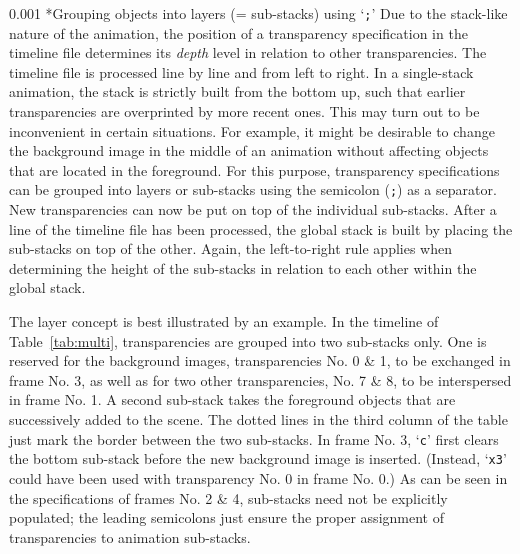 \documentclass[a4paper]{article}
\makeatletter
\newcommand\myparagraph{\@startsection{paragraph}{3}{\z@}%
                                     {\parskip}%
                                     {0.001\parskip}%
                                     {\itshape\normalsize}}
\makeatother
\begin{document}
\myparagraph*{Grouping objects into layers (= sub-stacks) using `{\tt;}'}
Due to the stack-like nature of the animation, the position of a transparency specification in the timeline file determines its \emph{depth} level in relation to other transparencies. The timeline file is processed line by line and from left to right. In a single-stack animation, the stack is strictly built from the bottom up, such that earlier transparencies are overprinted by more recent ones. This may turn out to be inconvenient in certain situations. For example, it might be desirable to change the background image in the middle of an animation without affecting objects that are located in the foreground. For this purpose, transparency specifications can be grouped into layers or sub-stacks using the semicolon (\verb+;+) as a separator. New transparencies can now be put on top of the individual sub-stacks. After a line of the timeline file has been processed, the global stack is built by placing the sub-stacks on top of the other. Again, the left-to-right rule applies when determining the height of the sub-stacks in relation to each other within the global stack.

The layer concept is best illustrated by an example. In the timeline of Table~\ref{tab:multi}, transparencies are grouped into two sub-stacks only. One is reserved for the background images, transparencies No. 0 \& 1, to be exchanged in frame No. 3, as well as for two other transparencies, No. 7 \& 8, to be interspersed in frame No. 1. A second sub-stack takes the foreground objects that are successively added to the scene. The dotted lines in the third column of the table just mark the border between the two sub-stacks. In frame No. 3, `\verb+c+' first clears the bottom sub-stack before the new background image is inserted. (Instead, `\verb+x3+' could have been used with transparency No. 0 in frame No. 0.) As can be seen in the specifications of frames No. 2 \& 4, sub-stacks need not be explicitly populated; the leading semicolons just ensure the proper assignment of transparencies to animation sub-stacks.
\end{document}
